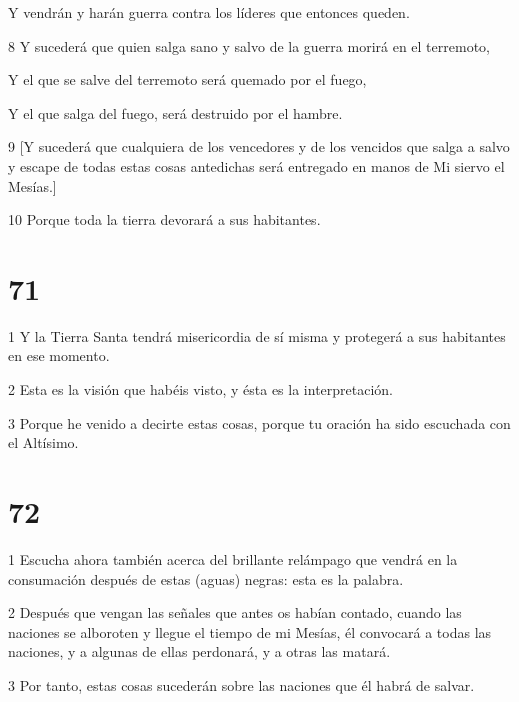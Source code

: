 \par Y vendrán y harán guerra contra los líderes que entonces queden.

\par 8 Y sucederá que quien salga sano y salvo de la guerra morirá en el terremoto,

\par Y el que se salve del terremoto será quemado por el fuego,

\par Y el que salga del fuego, será destruido por el hambre.

\par 9 [Y sucederá que cualquiera de los vencedores y de los vencidos que salga a salvo y escape de todas estas cosas antedichas será entregado en manos de Mi siervo el Mesías.]

\par 10 Porque toda la tierra devorará a sus habitantes.

\chapter{71}

\par 1 Y la Tierra Santa tendrá misericordia de sí misma y protegerá a sus habitantes en ese momento.

\par 2 Esta es la visión que habéis visto, y ésta es la interpretación.

\par 3 Porque he venido a decirte estas cosas, porque tu oración ha sido escuchada con el Altísimo.

\chapter{72}

\par 1 Escucha ahora también acerca del brillante relámpago que vendrá en la consumación después de estas (aguas) negras: esta es la palabra.

\par 2 Después que vengan las señales que antes os habían contado, cuando las naciones se alboroten y llegue el tiempo de mi Mesías, él convocará a todas las naciones, y a algunas de ellas perdonará, y a otras las matará.

\par 3 Por tanto, estas cosas sucederán sobre las naciones que él habrá de salvar.

